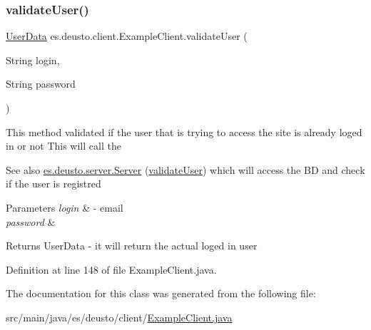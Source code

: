 \subsubsection{\texorpdfstring{validate\+User()}{validateUser()}}
{\footnotesize\ttfamily \hyperlink{classes_1_1deusto_1_1serialization_1_1_user_data}{User\+Data} es.\+deusto.\+client.\+Example\+Client.\+validate\+User (\begin{DoxyParamCaption}\item[{String}]{login,  }\item[{String}]{password }\end{DoxyParamCaption})}

This method validated if the user that is trying to access the site is already loged in or not This will call the \begin{DoxySeeAlso}{See also}
\hyperlink{classes_1_1deusto_1_1server_1_1_server}{es.\+deusto.\+server.\+Server} (\hyperlink{classes_1_1deusto_1_1client_1_1_example_client_a740fa7000d0cd30603ce100b299ba8ba}{validate\+User}) which will access the BD and check if the user is registred 
\end{DoxySeeAlso}

\begin{DoxyParams}{Parameters}
{\em login} & -\/ email \\
\hline
{\em password} & \\
\hline
\end{DoxyParams}
\begin{DoxyReturn}{Returns}
User\+Data -\/ it will return the actual loged in user 
\end{DoxyReturn}


Definition at line 148 of file Example\+Client.\+java.



The documentation for this class was generated from the following file\+:\begin{DoxyCompactItemize}
\item 
src/main/java/es/deusto/client/\hyperlink{_example_client_8java}{Example\+Client.\+java}\end{DoxyCompactItemize}

